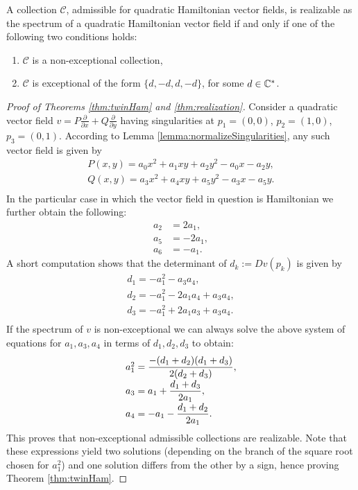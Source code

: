\documentclass[phd,tocprelim]{cornell}
\begin{document}
\begin{theorem}\label{thm:realization}
A collection $\mathcal{C}$, admissible for quadratic Hamiltonian vector fields, is realizable as the spectrum of a quadratic Hamiltonian vector field if and only if one of the following two conditions holds:
\begin{enumerate}
 \item $\mathcal{C}$ is a non-exceptional collection,
 \item $\mathcal{C}$ is exceptional of the form $\{d,-d,d,-d\}$, for some $d\in\mathbb{C}^{\ast}$.
\end{enumerate}
\end{theorem}

\begin{proof}[Proof of Theorems \ref*{thm:twinHam} and \ref*{thm:realization}]
Consider a quadratic vector field $v=P\frac{\partial}{\partial x}+Q\frac{\partial}{\partial y}$ having singularities at $p_1=(0,0)$, $p_2=(1,0)$, $p_3=(0,1)$. According to Lemma \ref{lemma:normalizeSingularities}, any such vector field is given by 
\begin{equation*}
\begin{array}{l}
 P(x,y) = a_0x^2+a_1xy+a_2y^2-a_0x-a_2y,  \\ 
 Q(x,y) = a_3x^2+a_4xy+a_5y^2-a_3x-a_5y. \\
\end{array}
\end{equation*}
In the particular case in which the vector field in question is Hamiltonian we further obtain the following:
\begin{align*}
a_2 &= 2a_1, \\
a_5 &= -2a_1, \\
a_6 &= -a_1.
\end{align*}
A short computation shows that the determinant of $d_k:=Dv(p_k)$ is given by
\begin{equation}\label{eq:detsHam}
\begin{array}{l} 
d_1 = -a_1^2-a_3a_4, \\
d_2 = -a_1^2-2a_1a_4+a_3a_4, \\
d_3 = -a_1^2+2a_1a_3+a_3a_4. \\
\end{array}
\end{equation}
If the spectrum of $v$ is non-exceptional we can always solve the above system of equations for $a_1,a_3,a_4$ in terms of $d_1,d_2,d_3$ to obtain:
\begin{equation*}
  \arraycolsep=1pt\def\arraystretch{1.8}
\begin{array}{l} 
a_1^2 = \displaystyle\frac{-(d_1+d_2)(d_1+d_3)}{2(d_2+d_3)}, \\
a_3   = a_1+\displaystyle\frac{d_1+d_3}{2a_1}, \\
a_4   = -a_1-\displaystyle\frac{d_1+d_2}{2a_1}. \\
\end{array}
\end{equation*}
This proves that non-exceptional admissible collections are realizable. Note that these expressions yield two solutions (depending on the branch of the square root chosen for $a_1^2$) and one solution differs from the other by a sign, hence proving Theorem \ref*{thm:twinHam}.


\end{proof}
\end{document}
